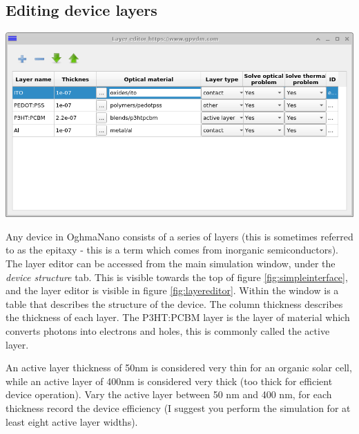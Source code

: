 \newpage
\subsection{Editing device layers}
\label{sec:layereditor}

\begin{minipage}{0.5\textwidth}
\centering
\includegraphics[width=\textwidth,height=0.7\textwidth]{./images/running/layer_editor.png}
\label{fig:layereditor}
\end{minipage}
\begin{minipage}[]{0.5\linewidth}
\hspace*{8px}
Any device in OghmaNano consists of a series of layers (this is sometimes referred to as the epitaxy - this is a term which comes from inorganic semiconductors). The layer editor can be accessed from the main simulation window, under the \emph{device structure} tab. This is visible towards the top of figure \ref{fig:simpleinterface}, and the layer editor is visible in figure \ref{fig:layereditor}. Within the window is a table that describes the structure of the device. The column thickness describes the thickness of each layer. The P3HT:PCBM layer is the layer of material which converts photons into electrons and holes, this is commonly called the active layer.
\end{minipage}
\vspace*{8px}
 An active layer thickness of 50nm is considered very thin for an organic solar cell, while an active layer of 400nm is considered very thick (too thick for efficient device operation). Vary the active layer between 50 nm and 400 nm, for each thickness record the device efficiency (I suggest you perform the simulation for at least eight active layer widths).



